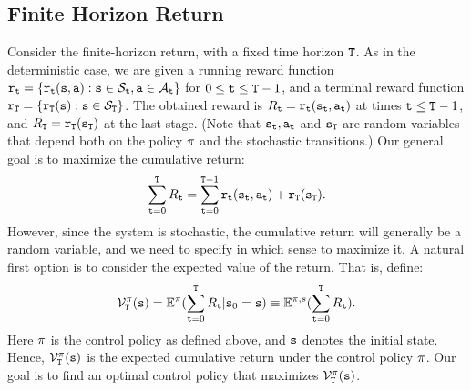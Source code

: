 \subsection{Finite Horizon Return}
Consider the finite-horizon return, with a fixed time horizon
${\tt T}$. As in the deterministic case, we are given a running
reward function ${{\tt r}_{\tt t}} = \{
{{\tt r}_{\tt t}}({\tt s},{\tt a}):{\tt s} \in {\mathcal{S}_{\tt t}},{\tt a}
\in {\mathcal{A}_{\tt t}}\} $ for $0 \le {\tt t} \le {\tt T} -1$, and a
terminal reward function ${{\tt r}_{\tt T}} = \{
{{\tt r}_{\tt T}}({\tt s}):{\tt s} \in {\mathcal{S}_{\tt T}}\} $.  The
obtained reward is  $R_{\tt t} =
{{\tt r}_{\tt t}}({{\tt s}_{\tt t}},{{\tt a}_{\tt t}})$ at times ${\tt t}
\le {\tt T} -1$, and ${R_{\tt T}} =
{{\tt r}_{\tt T}}({{\tt s}_{\tt T}})$ at the last stage. (Note
that ${\tt s}_{\tt t},{\tt a}_{\tt t}$ and ${\tt s}_{\tt T}$ are
random variables that depend both on the policy $\pi$ and the
stochastic transitions.)
 Our
general goal is to maximize the cumulative return:
\[
\sum\limits_{{\tt t} = 0}^{\tt T} {{R_{\tt t}}}  = \sum\limits_{{\tt t} = 0}^{{\tt T} -1}
{{{\tt r}_{\tt t}}({{\tt s}_{\tt t}},{{\tt a}_{\tt t}}) +
{{\tt r}_{\tt T}}({{\tt s}_{\tt T}})} .
\]
However, since the system is
stochastic, the cumulative return will generally be a random variable, and we
need to specify in which sense to maximize it. A natural first
option is to consider the expected value of the return. That is,
define:
\[\mathcal{V}_{\tt T}^\pi ({\tt s}) = {\mathbb{E}^\pi }(\sum\limits_{{\tt t} = 0}^{\tt T} {{R_{\tt t}}} |{{\tt s}_0} = {\tt s}) \equiv {\ensuremath{\mathbb{E}}^{\pi,s}}(\sum\limits_{{\tt t} = 0}^{\tt T} {{R_{\tt t}}} ) .\]
Here $\pi $ is the control policy as defined above, and ${\tt s}$
denotes the initial state. Hence,  $\mathcal{V}_{\tt T}^\pi
({\tt s})$ is the expected cumulative return under the control policy
$\pi $.  Our goal is to find an optimal control policy that
maximizes $\mathcal{V}_{\tt T}^\pi
 ({\tt s})$.

